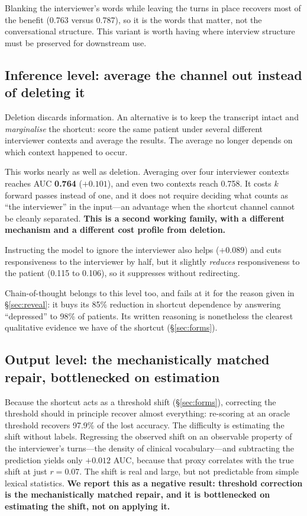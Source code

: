 \documentclass{article}
\begin{document}
Blanking the interviewer's words while leaving the turns in place recovers most
of the benefit (0.763 versus 0.787), so it is the words that matter, not the
conversational structure. This variant is worth having where interview structure
must be preserved for downstream use.

\subsection{Inference level: average the channel out instead of deleting it}

Deletion discards information. An alternative is to keep the transcript intact
and \emph{marginalise} the shortcut: score the same patient under several
different interviewer contexts and average the results. The average no longer
depends on which context happened to occur.

This works nearly as well as deletion. Averaging over four interviewer contexts
reaches AUC \textbf{0.764} ($+0.101$), and even two contexts reach 0.758. It
costs $k$ forward passes instead of one, and it does not require deciding what
counts as ``the interviewer'' in the input---an advantage when the shortcut
channel cannot be cleanly separated. \textbf{This is a second working family,
with a different mechanism and a different cost profile from deletion.}

Instructing the model to ignore the interviewer also helps ($+0.089$) and cuts
responsiveness to the interviewer by half, but it slightly \emph{reduces}
responsiveness to the patient (0.115 to 0.106), so it suppresses without
redirecting.

Chain-of-thought belongs to this level too, and fails at it for the reason given
in \S\ref{sec:reveal}: it buys its 85\% reduction in shortcut dependence by
answering ``depressed'' to 98\% of patients. Its written reasoning is
nonetheless the clearest qualitative evidence we have of the shortcut
(\S\ref{sec:forms}).

\subsection{Output level: the mechanistically matched repair, bottlenecked on
estimation}

Because the shortcut acts as a threshold shift (\S\ref{sec:forms}), correcting
the threshold should in principle recover almost everything: re-scoring at an
oracle threshold recovers 97.9\% of the lost accuracy. The difficulty is
estimating the shift without labels. Regressing the observed shift on an
observable property of the interviewer's turns---the density of clinical
vocabulary---and subtracting the prediction yields only $+0.012$ AUC, because
that proxy correlates with the true shift at just $r = 0.07$. The shift is real
and large, but not predictable from simple lexical statistics. \textbf{We report
this as a negative result: threshold correction is the mechanistically matched
repair, and it is bottlenecked on estimating the shift, not on applying it.}
\end{document}
